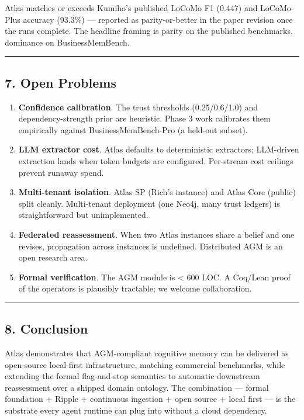 \documentclass[
  11pt,
]{article}
\providecommand{\tightlist}{%
  \setlength{\itemsep}{0pt}\setlength{\parskip}{0pt}}
\begin{document}
Atlas matches or exceeds Kumiho's published LoCoMo F1 (0.447) and
LoCoMo-Plus accuracy (93.3\%) --- reported as parity-or-better in the
paper revision once the runs complete. The headline framing is parity on
the published benchmarks, dominance on BusinessMemBench.

\begin{center}\rule{0.5\linewidth}{0.5pt}\end{center}

\subsection{7. Open Problems}\label{open-problems}

\begin{enumerate}
\def\labelenumi{\arabic{enumi}.}
\tightlist
\item
  \textbf{Confidence calibration}. The trust thresholds (0.25/0.6/1.0)
  and dependency-strength prior are heuristic. Phase 3 work calibrates
  them empirically against BusinessMemBench-Pro (a held-out subset).
\item
  \textbf{LLM extractor cost}. Atlas defaults to deterministic
  extractors; LLM-driven extraction lands when token budgets are
  configured. Per-stream cost ceilings prevent runaway spend.
\item
  \textbf{Multi-tenant isolation}. Atlas SP (Rich's instance) and Atlas
  Core (public) split cleanly. Multi-tenant deployment (one Neo4j, many
  trust ledgers) is straightforward but unimplemented.
\item
  \textbf{Federated reassessment}. When two Atlas instances share a
  belief and one revises, propagation across instances is undefined.
  Distributed AGM is an open research area.
\item
  \textbf{Formal verification}. The AGM module is \textless{} 600 LOC. A
  Coq/Lean proof of the operators is plausibly tractable; we welcome
  collaboration.
\end{enumerate}

\begin{center}\rule{0.5\linewidth}{0.5pt}\end{center}

\subsection{8. Conclusion}\label{conclusion}

Atlas demonstrates that AGM-compliant cognitive memory can be delivered
as open-source local-first infrastructure, matching commercial
benchmarks, while extending the formal flag-and-stop semantics to
automatic downstream reassessment over a shipped domain ontology. The
combination --- formal foundation + Ripple + continuous ingestion + open
source + local first --- is the substrate every agent runtime can plug
into without a cloud dependency.
\end{document}
